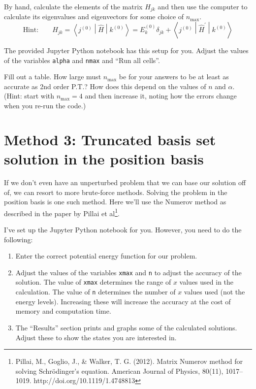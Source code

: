 \documentclass[fontsize=11pt,paper=letter,twoside=false,onecolumn]{article} %
\begin{document}
By hand, calculate the elements of the matrix $H_{jk}$ and then use the computer to calculate its eigenvalues and eigenvectors for some choice of $n_\text{max}$.
\[
\text{Hint:}\qquad H_{jk} = \left<j^{(0)} \middle\vert \hat{H} \middle\vert k^{(0)} \right>
= E^{(0)}_{k} \delta_{jk} + \left<j^{(0)} \middle\vert \hat{H}^\prime \middle\vert k^{(0)} \right>
\]

The provided Jupyter Python notebook has this setup for you.
Adjust the values of the variables \texttt{alpha} and \texttt{nmax} and ``Run all cells''.

Fill out a table.  How large must $n_\text{max}$ be for your answers to be at least as accurate as 2nd order P.T.?  How does this depend on the values of $n$ and $\alpha$.  (Hint: start with $n_\text{max}=4$ and then increase it, noting how the errors change when you re-run the code.)

\section{Method 3: Truncated basis set solution in the position basis}
If we don't even have an unperturbed problem that we can base our solution off of, we can resort to more brute-force methods.  Solving the problem in the position basis is one such method.  Here we'll use the Numerov method as described in the paper by Pillai et al\footnote{Pillai, M., Goglio, J., \& Walker, T. G. (2012). Matrix Numerov method for solving Schrödinger’s equation. American Journal of Physics, 80(11), 1017–1019. http://doi.org/10.1119/1.4748813}.

I've set up the Jupyter Python notebook for you.  However, you need to do the following:
\begin{enumerate}
\item Enter the correct potential energy function for our problem.
\item Adjust the values of the variables \texttt{xmax} and \texttt{n} to adjust the accuracy of the solution.
The value of \texttt{xmax} determines the range of $x$ values used in the calculation.
The value of \texttt{n} determines the number of $x$ values used (not the energy levels). 
Increasing these will increase the accuracy at the cost of memory and computation time.
\item The ``Results'' section prints and graphs some of the calculated solutions.
Adjust these to show the states you are interested in.
\end{enumerate}
\end{document}
